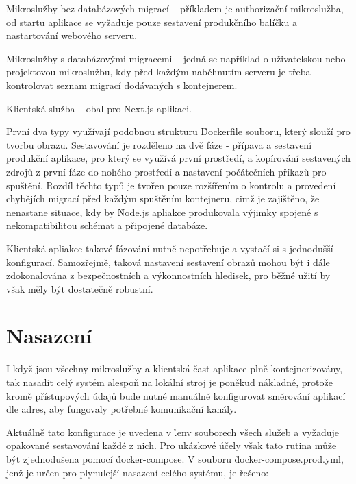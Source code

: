 \begin{dl}
   \item[Mikroslužby bez databázových migrací] – příkladem je authorizační mikroslužba, od startu aplikace se vyžaduje pouze sestavení produkčního balíčku a nastartování webového serveru.
   \item[Mikroslužby s databázovými migracemi] – jedná se například o uživatelskou nebo projektovou mikroslužbu, kdy před každým naběhnutím serveru je třeba kontrolovat seznam migrací dodávaných s kontejnerem.
   \item[Klientská služba] – obal pro Next.js aplikaci.
\end{dl}

První dva typy využívají podobnou strukturu \h{Dockerfile} souboru, který slouží pro tvorbu obrazu.
Sestavování je rozděleno na dvě fáze - přípava a sestavení produkční aplikace, pro který se využívá první prostředí, a kopírování sestavených zdrojů z první fáze do nohého prostředí a nastavení počátečních příkazů pro spuštění.
Rozdíl těchto typů je tvořen pouze rozšířením o kontrolu a provedení chybějích migrací před každým spuštěním kontejneru, cimž je zajištěno, že nenastane situace, kdy by \h{Node.js} apliakce produkovala výjimky spojené s nekompatibilitou  schémat a připojené databáze.

Klientská apliakce takové fázování nutně nepotřebuje a vystačí si s jednodušší konfigurací.
Samozřejmě, taková nastavení sestavení obrazů mohou být i dále zdokonalována z bezpečnostních a výkonnostních hledisek, pro běžné užití by však měly být dostatečně robustní.



\newpage

\section{Nasazení}\label{sec:deployment}
I když jsou všechny mikroslužby a klientská čast aplikace plně kontejnerizovány, tak nasadit celý systém alespoň na lokální stroj je poněkud nákladné, protože kromě přístupových údajů bude nutné manuálně konfigurovat směrování aplikací dle  adres, aby fungovaly potřebné komunikační kanály.

Aktuálně tato konfigurace je uvedena v \h{.env} souborech všech služeb a vyžaduje opakované sestavování každé z nich.
Pro ukázkové účely však tato rutina může být zjednodušena pomocí \h{docker-compose}.
V souboru \h{docker-compose.prod.yml}, jenž je určen pro plynulejší nasazení celého systému, je řešeno:


